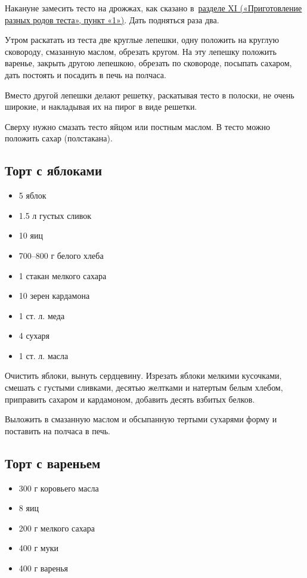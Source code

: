 Накануне замесить тесто на дрожжах, как сказано в~\hyperref[sub:drozhzhevoje]{разделе XI («Приготовление разных родов теста», пункт «1»)}. Дать подняться раза два.

Утром раскатать из теста две круглые лепешки, одну положить на круглую сковороду, смазанную маслом, обрезать кругом. На эту лепешку положить варенье, закрыть другою лепешкою, обрезать по сковороде, посыпать сахаром, дать постоять и посадить в печь на полчаса.

Вместо другой лепешки делают решетку, раскатывая тесто в полоски, не очень широкие, и накладывая их на пирог в виде решетки.

Сверху нужно смазать тесто яйцом или постным маслом. В тесто можно положить сахар (полстакана).

\subsection{Торт с яблоками}

\begin{itemize}
	\item 5 яблок 
    \item 1.5 л густых сливок
    \item 10 яиц 
    \item 700–800 г белого хлеба
    \item 1 стакан мелкого сахара 
    \item 10 зерен кардамона 
    \item 1 ст. л. меда 
    \item 4 сухаря
    \item 1 ст. л. масла
\end{itemize}

Очистить яблоки, вынуть сердцевину. Изрезать яблоки мелкими кусочками, смешать с густыми сливками, десятью желтками и натертым белым хлебом, приправить сахаром и кардамоном, добавить десять взбитых белков.

Выложить в смазанную маслом и обсыпанную тертыми сухарями форму и поставить на полчаса в печь.

\subsection{Торт с вареньем}\label{sec:rec8}

\begin{itemize}
	\item 300 г коровьего масла
    \item 8 яиц
    \item 200 г мелкого сахара
    \item 400 г муки
    \item 400 г варенья
\end{itemize}

